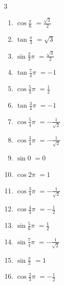 \begin{multicols}{3}
\begin{enumerate}
  \item $\displaystyle \cos{\frac{\pi}{6}}$
        $\displaystyle =\frac{\sqrt{3}}{2}$

\columnbreak %

  \item $\displaystyle \tan{\frac{\pi}{3}}$
        $\displaystyle =\sqrt{3}$

  \item $\displaystyle \sin{\frac{2}{3}\pi}$
        $\displaystyle =\frac{\sqrt{3}}{2}$

  \item $\displaystyle \tan{\frac{7}{4}\pi}$
        $\displaystyle =-1$

  \item $\displaystyle \cos{\frac{5}{3}\pi}$
        $\displaystyle =\frac{1}{2}$

  \item $\displaystyle \tan{\frac{3}{4}\pi}$
        $\displaystyle =-1$

  \item $\displaystyle \cos{\frac{5}{4}\pi}$
        $\displaystyle =-\frac{1}{\sqrt{2}}$

  \item $\displaystyle \cos{\frac{3}{4}\pi}$
        $\displaystyle =-\frac{1}{\sqrt{2}}$

  \item $\displaystyle \sin{0}$
        $\displaystyle =0$

  \item $\displaystyle \cos{2\pi}$
        $\displaystyle =1$

  \item $\displaystyle \cos{\frac{3}{4}\pi}$
        $\displaystyle =-\frac{1}{\sqrt{2}}$

  \item $\displaystyle \cos{\frac{4}{3}\pi}$
        $\displaystyle =-\frac{1}{2}$

  \item $\displaystyle \sin{\frac{5}{6}\pi}$
        $\displaystyle =\frac{1}{2}$

  \item $\displaystyle \sin{\frac{7}{4}\pi}$
        $\displaystyle =-\frac{1}{\sqrt{2}}$

  \item $\displaystyle \sin{\frac{\pi}{2}}$
        $\displaystyle =1$

  \item $\displaystyle \cos{\frac{2}{3}\pi}$
        $\displaystyle =-\frac{1}{2}$


\end{enumerate}
\end{multicols}
